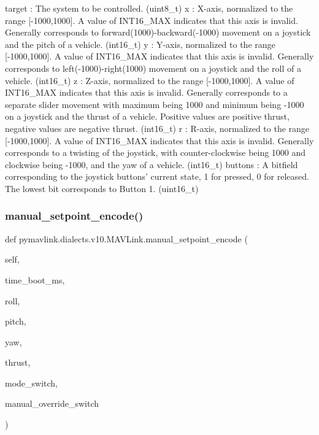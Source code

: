 \begin{DoxyVerb}
\begin{DoxyVerb}
\begin{DoxyVerb}
\begin{DoxyVerb}
\begin{DoxyVerb}
target                    : The system to be controlled. (uint8_t)
x                         : X-axis, normalized to the range [-1000,1000]. A value of INT16_MAX indicates that this axis is invalid. Generally corresponds to forward(1000)-backward(-1000) movement on a joystick and the pitch of a vehicle. (int16_t)
y                         : Y-axis, normalized to the range [-1000,1000]. A value of INT16_MAX indicates that this axis is invalid. Generally corresponds to left(-1000)-right(1000) movement on a joystick and the roll of a vehicle. (int16_t)
z                         : Z-axis, normalized to the range [-1000,1000]. A value of INT16_MAX indicates that this axis is invalid. Generally corresponds to a separate slider movement with maximum being 1000 and minimum being -1000 on a joystick and the thrust of a vehicle. Positive values are positive thrust, negative values are negative thrust. (int16_t)
r                         : R-axis, normalized to the range [-1000,1000]. A value of INT16_MAX indicates that this axis is invalid. Generally corresponds to a twisting of the joystick, with counter-clockwise being 1000 and clockwise being -1000, and the yaw of a vehicle. (int16_t)
buttons                   : A bitfield corresponding to the joystick buttons' current state, 1 for pressed, 0 for released. The lowest bit corresponds to Button 1. (uint16_t)\end{DoxyVerb}
 \mbox{\label{classpymavlink_1_1dialects_1_1v10_1_1MAVLink_ac275a76509810de25600f1659c5fc40c}} 
\subsubsection{\texorpdfstring{manual\+\_\+setpoint\+\_\+encode()}{manual\_setpoint\_encode()}}
{\footnotesize\ttfamily def pymavlink.\+dialects.\+v10.\+M\+A\+V\+Link.\+manual\+\_\+setpoint\+\_\+encode (\begin{DoxyParamCaption}\item[{}]{self,  }\item[{}]{time\+\_\+boot\+\_\+ms,  }\item[{}]{roll,  }\item[{}]{pitch,  }\item[{}]{yaw,  }\item[{}]{thrust,  }\item[{}]{mode\+\_\+switch,  }\item[{}]{manual\+\_\+override\+\_\+switch }\end{DoxyParamCaption})}


\end{DoxyVerb}
\end{DoxyVerb}
\end{DoxyVerb}
\end{DoxyVerb}
